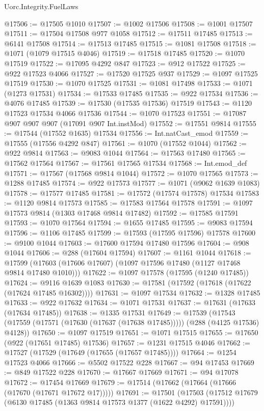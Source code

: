 \begin{lexlean}{Uorc.Integrity.FuelLaws}
\begin{coremodule}
@17506 := @17505 @1010
@17507 := @1002 @17506
@17508 := @1001 @17507
@17511 := @17504 @17508 @977 @1058
@17512 := @17511 @17485
@17513 := @6141 @17508
@17514 := @17513 @17485
@17515 := @1081 @17508
@17518 := @1071 (@1079 @17515 @4046)
@17519 := @17518 @17485
@17520 := @1070 @17519
@17522 := @17095 @4292 @847
@17523 := @912 @17522
@17525 := @922 @17523 @4066
@17527 := @17520 @17525 @937
@17529 := @1097 @17525 @17519
@17530 := @1070 @17525
@17531 := @1081 @17498
@17533 := @1071 (@1273 @17531)
@17534 := @17533 @17485
@17535 := @922 @17534
@17536 := @4076 @17485
@17539 := @17530 (@17535 @17536) @17519
@17543 := @1120 @17523 @17534 @4066 @17536
@17544 := @1070 @17523
@17551 := @17087 @907 @907 @907 (@17091 @907 Int.instMod)
@17552 := @17551 @9814
@17555 := @17544 (@17552 @1635) @17534
@17556 := Int.natCast_emod
@17559 := @17555 (@17556 @4292 @847)
@17561 := @1070 (@17552 @1044)
@17562 := @922 @9814
@17563 := @9083 @1044
@17564 := @17563 @17480
@17565 := @17562 @17564
@17567 := @17561 @17565 @17534
@17568 := Int.emod_def
@17571 := @17567 (@17568 @9814 @1044)
@17572 := @1070 @17565
@17573 := @1288 @17485
@17574 := @922 @17573
@17577 := @1071 (@9062 @1639 @1083)
@17578 := @17577 @17485
@17581 := @17572 (@17574 @17578) @17534
@17583 := @1120 @9814 @17573
@17585 := @17583 @17564 @17578
@17591 := @1097 @17573 @9814 (@1303 @17468 @9814 @17482)
@17592 := @17585 @17591
@17593 := @1070 @17564
@17594 := @1655 @17485
@17595 := @9083 @17594
@17596 := @1106 @17485
@17599 := @17593 (@17595 @17596) @17578
@17600 := @9100 @1044
@17603 := @17600 @17594 @17480 @17596
@17604 := @908 @1044
@17606 := @288 (@17604 @17594)
@17607 := @1161 @1044
@17618 := @17599 (@17603 (@17606 @17607) (@1097 @17596 @17480 (@1127 @17468 @9814 @17480 @1010)))
@17622 := @1097 @17578 (@17595 (@1240 @17485))
@17624 := @9116 @1639 @1083
@17630 := @17581 (@17592 (@17618 (@17622 (@17624 @17485 @16302))))
@17631 := @1097 @17534
@17632 := @1328 @17485
@17633 := @922 @17632
@17634 := @1071 @17531
@17637 := @17631 (@17633 (@17634 @17485))
@17638 := @1335 @17531
@17649 := @17539
    (@17543 (@17559 (@17571 (@17630 (@17637 (@17638 @17485))))) (@288 (@4125 @17536) @4128))
@17650 := @1097 @17519
@17651 := @1071 @17515
@17655 := @17650 (@922 (@17651 @17485) @17536)
@17657 := @1231 @17515 @4046
@17662 := @17527 (@17529 (@17649 (@17655 (@17657 @17485))))
@17664 := @1254 @17523 @4066
@17666 := @5502 @17522 @228
@17667 := @94 @17453
@17669 := @849 @17522 @228
@17670 := @17667 @17669
@17671 := @94 @17078
@17672 := @17454 @17669
@17679 := @17514 (@17662 (@17664 (@17666 (@17670 (@17671 @17672 @17)))))
@17691 := @17501
    (@17503 (@17512 @17679 (@6130 @17485 (@1363 @9814 @17573 @1377 (@1622 @4292) @17591))))

\end{coremodule}
\end{lexlean}
